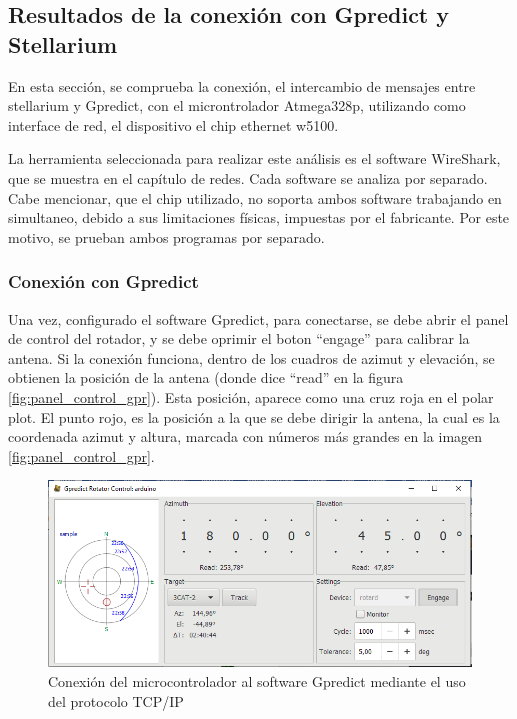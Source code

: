 \subsection{Resultados de la conexión con Gpredict y Stellarium} 

En esta sección, se comprueba la conexión, el intercambio de mensajes entre stellarium y Gpredict, con el microntrolador Atmega328p, utilizando como interface de red, el dispositivo el chip ethernet w5100. 

La herramienta seleccionada para realizar este análisis es el software WireShark, que se muestra en el capítulo de redes. Cada software se analiza por separado. Cabe mencionar, que el chip utilizado, no soporta ambos software trabajando en simultaneo, debido a sus limitaciones físicas, impuestas por el fabricante. Por este motivo, se prueban ambos programas por separado. 

\subsubsection{Conexión con Gpredict} 

Una vez, configurado el software Gpredict, para conectarse, se debe abrir el panel de control del rotador, y se debe oprimir el boton ``engage'' para calibrar la antena. Si la conexión funciona, dentro de los cuadros de azimut y elevación, se obtienen la posición de la antena (donde dice ``read'' en la figura \ref{fig:panel_control_gpr}). Esta posición, aparece como una cruz roja en el polar plot. El punto rojo, es la posición a la que se debe dirigir la antena, la cual es la coordenada azimut y altura, marcada con números más grandes en la imagen \ref{fig:panel_control_gpr}. 


\begin{figure}[ht]
	\includegraphics[scale=0.7]{gpred_rotador} 
	\caption{Conexión del microcontrolador al software Gpredict mediante el uso del protocolo TCP/IP} 
	\label{fig:prueba_gpredict_1} 
\end{figure}

